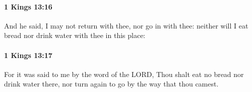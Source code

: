 		\paragraph{1 Kings 13:16} %
			\label{1KINGS-13-16}

			And he said, I may not return with thee, nor go in with thee: neither will I eat bread nor drink water with thee in this place:


		\paragraph{1 Kings 13:17} %
			\label{1KINGS-13-17}

			For it was said to me by the word of the LORD, Thou shalt eat no bread nor drink water there, nor turn again to go by the way that thou camest.


